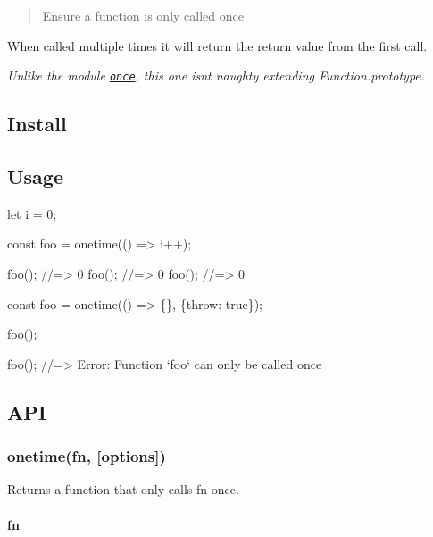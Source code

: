 \begin{quote}
Ensure a function is only called once \end{quote}


When called multiple times it will return the return value from the first call.

{\itshape Unlike the module \href{https://github.com/isaacs/once}{\tt once}, this one isn\textquotesingle{}t naughty extending {\ttfamily Function.\+prototype}.}

\subsection*{Install}




\subsection*{Usage}


\begin{DoxyCode}
let i = 0;

const foo = onetime(() => i++);

foo(); //=> 0
foo(); //=> 0
foo(); //=> 0
\end{DoxyCode}



\begin{DoxyCode}
const foo = onetime(() => \{\}, \{throw: true\});

foo();

foo();
//=> Error: Function `foo` can only be called once
\end{DoxyCode}


\subsection*{A\+PI}

\subsubsection*{onetime(fn, \mbox{[}options\mbox{]})}

Returns a function that only calls {\ttfamily fn} once.

\paragraph*{fn}

